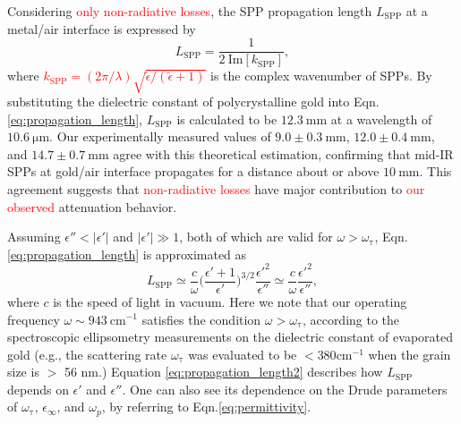 \documentclass[aip,apl,reprint]{revtex4-1}
\begin{document}
\color{black}
Considering \textcolor{red}{only non-radiative losses}, the SPP propagation length $L_{\mathrm{SPP}}$ at a metal/air interface is expressed by 
\begin{equation}
 L_{\mathrm{SPP}} = \frac{1}{2\:\mathrm{Im}[k_{\mathrm{SPP}}]},
\label{eq:propagation_length}
\end{equation}
where \textcolor{red}{$k_{\mathrm{SPP}}=(2\pi/\lambda)\sqrt{\tilde{\epsilon}/(\tilde{\epsilon}+1)}$} is the complex wavenumber of SPPs. By substituting the dielectric constant of polycrystalline gold\cite{Palik} into Eqn. \ref{eq:propagation_length}, $L_{\mathrm{SPP}}$ is calculated to be $12.3\:\mathrm{mm}$ at a wavelength of $10.6\:\mathrm{\mu m}$.
Our experimentally measured values of $9.0\pm0.3\:\mathrm{mm}$, $12.0\pm0.4\:\mathrm{mm}$, and $14.7\pm0.7\:\mathrm{mm}$ agree with this theoretical estimation, confirming that mid-IR SPPs at gold/air interface propagates for a distance about or above $10\:\mathrm{mm}$. This agreement suggests that \textcolor{red}{non-radiative losses} have major contribution to \textcolor{red}{our observed} attenuation behavior.

\color{red}
Assuming $\epsilon'' < |\epsilon'|$ and $|\epsilon'| \gg 1$, both of which are valid for $\omega > \omega_{\mathrm{\tau}}$, Eqn.\ref{eq:propagation_length} is approximated as\cite{Raether}
\begin{equation}
L_{\mathrm{SPP}} \simeq \frac{c}{\omega} \biggl(\frac{\epsilon'+1}{\epsilon'}\biggr)^{3/2} \frac{\epsilon'^2}{\epsilon''} \simeq \frac{c}{\omega} \frac{\epsilon'^2}{\epsilon''},
\label{eq:propagation_length2}
\end{equation}
where $c$ is the speed of light in vacuum. Here we note that our operating frequency $\omega \sim 943 ~\mathrm{cm}^{-1}$ satisfies the condition $\omega > \omega_{\mathrm{\tau}}$, according to the spectroscopic ellipsometry measurements on the dielectric constant of evaporated gold \cite{Olmon, Trollmann}  (e.g., the scattering rate $\omega_{\mathrm{\tau}}$ was evaluated to be $< 380 \mathrm{cm}^{-1}$ when the grain size is $>$ 56 nm.\cite{Trollmann}) Equation \ref{eq:propagation_length2} describes how $L_{\mathrm{SPP}}$ depends on $\epsilon'$ and $\epsilon''$. One can also see its dependence on the Drude parameters of $\omega_{\mathrm{\tau}}$, $\epsilon_{\infty}$, and $\omega_p$, by referring to Eqn.\ref{eq:permittivity}.
\end{document}
